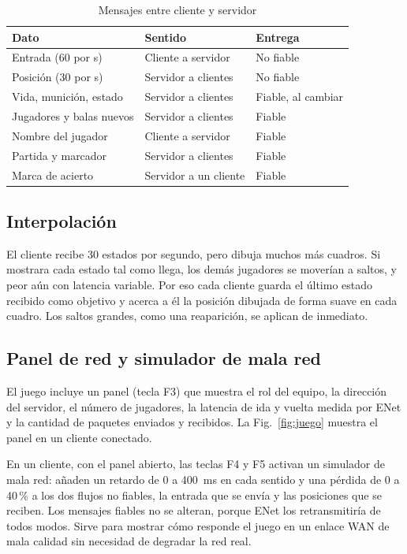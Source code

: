 \documentclass[conference]{IEEEtran}
\begin{document}
\begin{table}[htbp]
\caption{Mensajes entre cliente y servidor}
\label{tab:mensajes}
\centering
\begin{tabular}{|l|l|l|}
\hline
\textbf{Dato} & \textbf{Sentido} & \textbf{Entrega} \\
\hline
Entrada (60 por s) & Cliente a servidor & No fiable \\
Posición (30 por s) & Servidor a clientes & No fiable \\
Vida, munición, estado & Servidor a clientes & Fiable, al cambiar \\
Jugadores y balas nuevos & Servidor a clientes & Fiable \\
Nombre del jugador & Cliente a servidor & Fiable \\
Partida y marcador & Servidor a clientes & Fiable \\
Marca de acierto & Servidor a un cliente & Fiable \\
\hline
\end{tabular}
\end{table}

\subsection{Interpolación}
El cliente recibe 30 estados por segundo, pero dibuja muchos más cuadros. Si
mostrara cada estado tal como llega, los demás jugadores se moverían a saltos,
y peor aún con latencia variable. Por eso cada cliente guarda el último estado
recibido como objetivo y acerca a él la posición dibujada de forma suave en
cada cuadro. Los saltos grandes, como una reaparición, se aplican de inmediato.

\subsection{Panel de red y simulador de mala red}
El juego incluye un panel (tecla F3) que muestra el rol del equipo, la dirección
del servidor, el número de jugadores, la latencia de ida y vuelta medida por
ENet y la cantidad de paquetes enviados y recibidos. La Fig.~\ref{fig:juego}
muestra el panel en un cliente conectado.

En un cliente, con el panel abierto, las teclas F4 y F5 activan un simulador de
mala red: añaden un retardo de 0 a 400~ms en cada sentido y una pérdida de 0 a
40\,\% a los dos flujos no fiables, la entrada que se envía y las posiciones
que se reciben. Los mensajes fiables no se alteran, porque ENet los
retransmitiría de todos modos. Sirve para mostrar cómo responde el juego en un
enlace WAN de mala calidad sin necesidad de degradar la red real.
\end{document}
